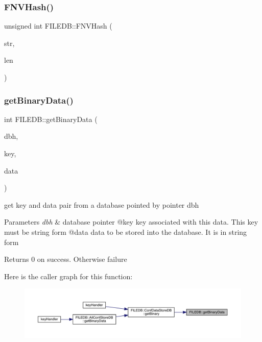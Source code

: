 \subsubsection{\texorpdfstring{FNVHash()}{FNVHash()}}
{\footnotesize\ttfamily unsigned int F\+I\+L\+E\+D\+B\+::\+F\+N\+V\+Hash (\begin{DoxyParamCaption}\item[{char $\ast$}]{str,  }\item[{unsigned int}]{len }\end{DoxyParamCaption})}

\mbox{\label{namespaceFILEDB_a0de8699301294566d0e11786f4016a2a}} 
\subsubsection{\texorpdfstring{getBinaryData()}{getBinaryData()}}
{\footnotesize\ttfamily int F\+I\+L\+E\+D\+B\+::get\+Binary\+Data (\begin{DoxyParamCaption}\item[{\mbox{\hyperlink{adat-devel_2other__libs_2filedb_2filehash_2ffdb__db_8h_a0b27b956926453a7a8141ea8e10f0df8}{F\+F\+D\+B\+\_\+\+DB}} $\ast$}]{dbh,  }\item[{const std\+::string \&}]{key,  }\item[{std\+::string \&}]{data }\end{DoxyParamCaption})}

get key and data pair from a database pointed by pointer dbh


\begin{DoxyParams}{Parameters}
{\em dbh} & database pointer @key key associated with this data. This key must be string form @data data to be stored into the database. It is in string form\\
\hline
\end{DoxyParams}
\begin{DoxyReturn}{Returns}
0 on success. Otherwise failure 
\end{DoxyReturn}
Here is the caller graph for this function\+:
\nopagebreak
\begin{figure}[H]
\begin{center}
\leavevmode
\includegraphics[width=350pt]{d2/de6/namespaceFILEDB_a0de8699301294566d0e11786f4016a2a_icgraph}
\end{center}
\end{figure}
\mbox{\label{namespaceFILEDB_a0d18d10ad6d490786b6fe538fbd45dc3}} 

